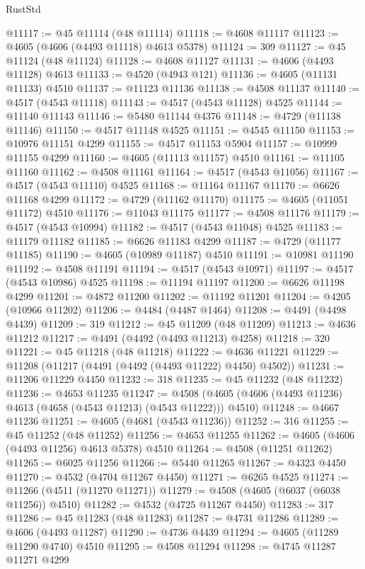 \begin{lexlean}{RustStd}
\begin{coremodule}
@11117 := @45 @11114 (@48 @11114)
@11118 := @4608 @11117
@11123 := @4605 (@4606 (@4493 @11118) @4613 @5378)
@11124 := 309
@11127 := @45 @11124 (@48 @11124)
@11128 := @4608 @11127
@11131 := @4606 (@4493 @11128) @4613
@11133 := @4520 (@4943 @121)
@11136 := @4605 (@11131 @11133) @4510
@11137 := @11123 @11136
@11138 := @4508 @11137
@11140 := @4517 (@4543 @11118)
@11143 := @4517 (@4543 @11128) @4525
@11144 := @11140 @11143
@11146 := @5480 @11144 @4376
@11148 := @4729 (@11138 @11146)
@11150 := @4517 @11148 @4525
@11151 := @4545 @11150
@11153 := @10976 @11151 @4299
@11155 := @4517 @11153 @5904
@11157 := @10999 @11155 @4299
@11160 := @4605 (@11113 @11157) @4510
@11161 := @11105 @11160
@11162 := @4508 @11161
@11164 := @4517 (@4543 @11056)
@11167 := @4517 (@4543 @11110) @4525
@11168 := @11164 @11167
@11170 := @6626 @11168 @4299
@11172 := @4729 (@11162 @11170)
@11175 := @4605 (@11051 @11172) @4510
@11176 := @11043 @11175
@11177 := @4508 @11176
@11179 := @4517 (@4543 @10994)
@11182 := @4517 (@4543 @11048) @4525
@11183 := @11179 @11182
@11185 := @6626 @11183 @4299
@11187 := @4729 (@11177 @11185)
@11190 := @4605 (@10989 @11187) @4510
@11191 := @10981 @11190
@11192 := @4508 @11191
@11194 := @4517 (@4543 @10971)
@11197 := @4517 (@4543 @10986) @4525
@11198 := @11194 @11197
@11200 := @6626 @11198 @4299
@11201 := @4872 @11200
@11202 := @11192 @11201
@11204 := @4205 (@10966 @11202)
@11206 := @4484 (@4487 @1464)
@11208 := @4491 (@4498 @4439)
@11209 := 319
@11212 := @45 @11209 (@48 @11209)
@11213 := @4636 @11212
@11217 := @4491 (@4492 (@4493 @11213) @4258)
@11218 := 320
@11221 := @45 @11218 (@48 @11218)
@11222 := @4636 @11221
@11229 := @11208 (@11217 (@4491 (@4492 (@4493 @11222) @4450) @4502))
@11231 := @11206 @11229 @4450
@11232 := 318
@11235 := @45 @11232 (@48 @11232)
@11236 := @4653 @11235
@11247 := @4508 (@4605 (@4606 (@4493 @11236) @4613 (@4658 (@4543 @11213) (@4543 @11222))) @4510)
@11248 := @4667 @11236
@11251 := @4605 (@4681 (@4543 @11236))
@11252 := 316
@11255 := @45 @11252 (@48 @11252)
@11256 := @4653 @11255
@11262 := @4605 (@4606 (@4493 @11256) @4613 @5378) @4510
@11264 := @4508 (@11251 @11262)
@11265 := @6025 @11256
@11266 := @5440 @11265
@11267 := @4323 @4450
@11270 := @4532 (@4704 @11267 @4450)
@11271 := @6265 @4525
@11274 := @11266 (@4511 (@11270 @11271))
@11279 := @4508 (@4605 (@6037 (@6038 @11256)) @4510)
@11282 := @4532 (@4725 @11267 @4450)
@11283 := 317
@11286 := @45 @11283 (@48 @11283)
@11287 := @4731 @11286
@11289 := @4606 (@4493 @11287)
@11290 := @4736 @4439
@11294 := @4605 (@11289 @11290 @4740) @4510
@11295 := @4508 @11294
@11298 := @4745 @11287 @11271 @4299

\end{coremodule}
\end{lexlean}
